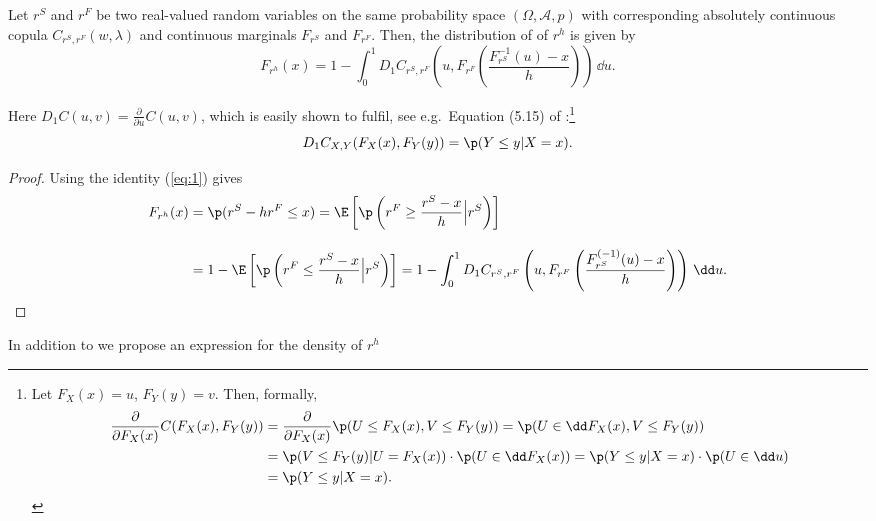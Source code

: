 \documentclass[11pt,a4paper,english]{article}
\begin{document}
\begin{proposition}
  \label{prop:dfrh}
  Let $r^S$ and $r^F$ be two real-valued random variables on the same
  probability space $(\Omega, \mathcal A, p)$ with corresponding
  absolutely continuous copula $C_{r^S, r^F}(w,\lambda)$ and
  continuous marginals $F_{r^S}$ and $F_{r^F}$. Then, the distribution
  of of $r^h$ is given by
  \begin{equation}
    \label{eq:3}
    F_{r^h}(x) = 1- \int^1_0 D_1 C_{r^S, r^F}
    \left( u, F_{r^F} \left( \frac{F^{-1}_{r^S}(u)-x}{h} \right)
    \right)\, \dd u.
  \end{equation}
\end{proposition}\medskip
Here $D_1 C(u,v)=\displaystyle \frac{\partial}{\partial u} C(u,v)$,
which is easily shown to fulfil, see e.g.\ Equation (5.15) of
\citep{McNeil2005}:\footnote{%
  Let $F_X(x)=u$, $F_Y(y)=v$. Then, formally,
  \begin{align*}
    \frac{\partial}{\partial F_X(x)} C(F_X(x), F_Y(y)) %
    &= \frac{\partial}{\partial F_X(x)} \p(U\leq F_X(x),
      V\leq F_Y(y)) %
      = \p(U\in \dd F_X(x), V\leq F_Y(y))\\ %
    &= \p(V\leq F_Y(y)| U = F_X(x))\cdot \p(U \in \dd
      F_X(x)) %
      = \p(Y\leq y|X=x)\cdot \p(U\in \dd u)\\ %
    &= \p(Y\leq y|X=x).
  \end{align*}}
\begin{equation}
  \label{eq:1}
  D_1 C_{X,Y}(F_X(x), F_Y(y)) = \p(Y\leq y|X=x).
\end{equation}
\begin{proof}
  Using the identity (\ref{eq:1}) gives
  \begin{align*}
    F_{r^h}(x) &= \p(r^S - h r^F\leq x) %
                 = \E\left[\p\left(r^F\geq \frac{r^S-x}{h}\Big|
                 r^S\right)\right]\\[10pt]
               &= 1-\E\left[\p\left(r^F\leq \frac{r^S-x}{h}\Big|
                 r^S\right)\right]%
               = 1- \int_0^1 D_1 C_{r^S, r^F}\left(u,
                 F_{r^F}\left(\frac{F^{(-1)}_{r^S}(u) -
                 x}{h}\right)\right)\, \dd u.
  \end{align*}
\end{proof}\medskip

In addition to \cite{barbi2014copula} we propose an expression for the density of $r^h$
\end{document}
